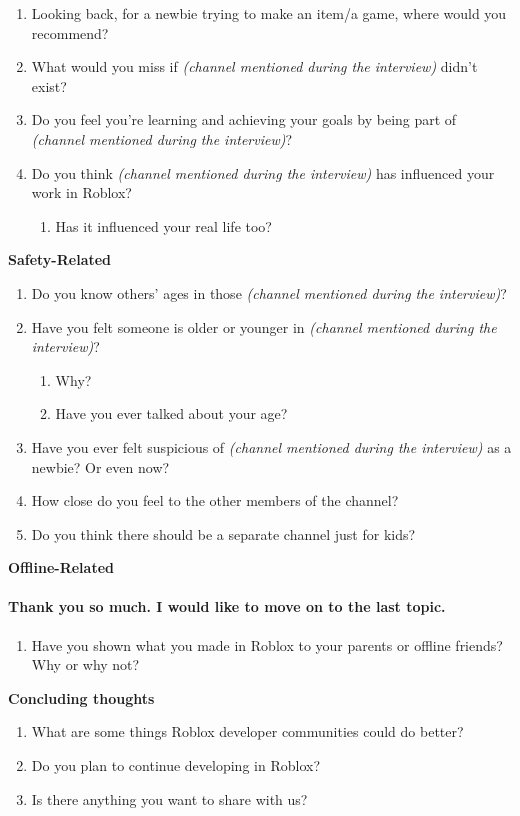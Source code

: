 \begin{appendix}
\begin{enumerate}[label=\arabic*., topsep=1pt, noitemsep]
    \item Looking back, for a newbie trying to make an item/a game, where would you recommend?
    \item What would you miss if \textit{(channel mentioned during the interview)} didn’t exist?
    \item Do you feel you’re learning and achieving your goals by being part of \textit{(channel mentioned during the interview)}?
    \item Do you think \textit{(channel mentioned during the interview)} has influenced your work in Roblox?
        \begin{enumerate}
            \item Has it influenced your real life too?
        \end{enumerate}
\end{enumerate}

\noindent\textbf{Safety-Related}
\begin{enumerate}[label=\arabic*., topsep=1pt, noitemsep]
    \item Do you know others’ ages in those \textit{(channel mentioned during the interview)}?
    \item Have you felt someone is older or younger in \textit{(channel mentioned during the interview)}?
        \begin{enumerate}
            \item Why?
            \item Have you ever talked about your age?
        \end{enumerate}
    \item Have you ever felt suspicious of \textit{(channel mentioned during the interview)} as a newbie? Or even now?
    \item How close do you feel to the other members of the channel?
    \item Do you think there should be a separate channel just for kids?
\end{enumerate}

\noindent\textbf{Offline-Related}
\paragraph{Thank you so much. I would like to move on to the last topic.}
\begin{enumerate}[label=\arabic*., topsep=1pt, noitemsep]
    \item Have you shown what you made in Roblox to your parents or offline friends? Why or why not?
\end{enumerate}

\noindent\textbf{Concluding thoughts}
\begin{enumerate}[label=\arabic*., topsep=1pt, noitemsep]
    \item What are some things Roblox developer communities could do better?
    \item Do you plan to continue developing in Roblox?
    \item Is there anything you want to share with us?
\end{enumerate}


\end{appendix}
